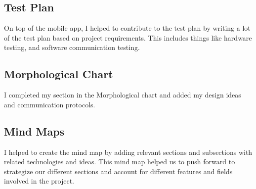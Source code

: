 \subsection{Test Plan}

On top of the mobile app, I helped to contribute to the test plan by writing a lot of the test plan based on project requirements. This includes things like hardware testing, and software communication testing.

\subsection{Morphological Chart}

I completed my section in the Morphological chart and added my design ideas and communication protocols.

\subsection{Mind Maps}

I helped to create the mind map by adding relevant sections and subsections with related technologies and ideas. This mind map helped us to push forward to strategize our different sections and account for different features and fields involved in the project.